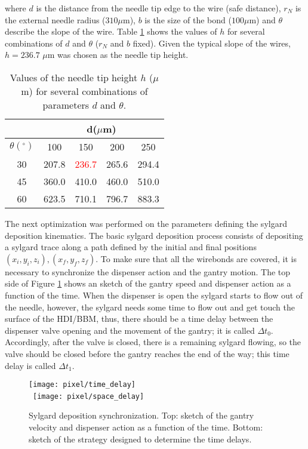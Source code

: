 \noindent where $d$ is the distance from the needle tip edge to the wire (safe distance), $r_N$ is the external needle radius ($310 \mu$m), $b$ is the size of the bond ($100 \mu$m) and $\theta$ describe the slope of the wire. Table \ref{tab:needle_tip_heights} shows the values of $h$ for several combinations of $d$ and $\theta$ ($r_N$ and $b$ fixed). Given the typical slope of the wires, $h=236.7$ $\mu$m was chosen as the needle tip height.   
\begin{table}
  \centering
  \begin{tabular}{ c  c  c  c  c } \hline
               &\multicolumn{4}{c}{d($\mu$m)}\\\hline
  $\theta(^\circ)$ & 100   & 150   & 200   & 250 \\\hline
    30         & 207.8 & \textcolor{red}{236.7} & 265.6 & 294.4 \\
    45         & 360.0 & 410.0 & 460.0 & 510.0 \\
    60         & 623.5 & 710.1 & 796.7 & 883.3 \\\hline
  \end{tabular}
  \caption[Values of the needle tip height $h$]{Values of the needle tip height $h$ ($\mu$m) for several combinations of parameters $d$ and $\theta$. }\label{tab:needle_tip_heights}
\end{table}

The next optimization was performed on the parameters defining the sylgard deposition kinematics. The basic sylgard deposition process consists of depositing a sylgard trace along a path defined by the initial and final positions $(x_i, y_i, z_i), (x_f, y_f, z_f)$. To make sure that all the wirebonds are covered, it is necessary to synchronize the dispenser action and the gantry motion. The top side of Figure \ref{fig:sylgard_synch} shows an sketch of the gantry speed and dispenser action as a function of the time. When the dispenser is open the sylgard starts to flow out of the needle, however, the sylgard needs some time to flow out and get touch the surface of the HDI/BBM, thus, there should be a time delay between the dispenser valve opening and the movement of the gantry; it is called $\Delta t_0$. Accordingly, after the valve is closed, there is a remaining sylgard flowing, so the valve should be closed before the gantry reaches the end of the way; this time delay is called $\Delta t_1$.

\begin{figure}[h]
  \centering
    \texttt{[image: pixel/time\_delay]}\\\ 
    \texttt{[image: pixel/space\_delay]}
    \caption[Sylgard deposition synchronization.]{Sylgard deposition synchronization. Top: sketch of the gantry velocity and dispenser action as a function of the time. Bottom: sketch of the strategy designed to determine the time delays.}\label{fig:sylgard_synch}
\end{figure}

